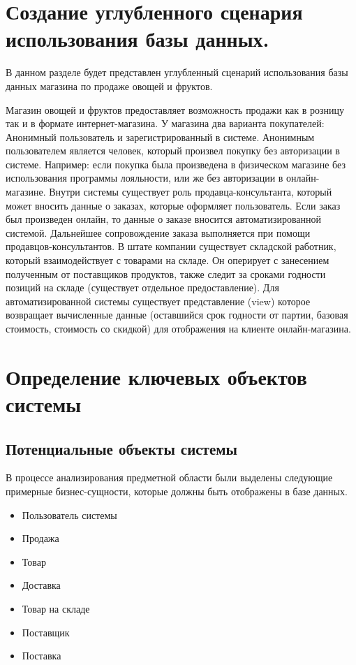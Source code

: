 \documentclass[14pt]{extreport}
\begin{document}
\pagestyle{empty} %


\pagestyle{plain} %

\chapter{Создание углубленного сценария использования базы данных.}

В данном разделе будет представлен углубленный сценарий использования базы данных магазина по продаже овощей и фруктов.


Магазин овощей и фруктов предоставляет возможность продажи как в розницу так и в формате интернет-магазина. У магазина два варианта покупателей: Анонимный пользователь и зарегистрированный в системе. Анонимным пользователем является человек, который произвел покупку без авторизации в системе. Например: если покупка была произведена в физическом магазине без использования программы лояльности, или же без авторизации в онлайн-магазине. Внутри системы существует роль продавца-консультанта, который может вносить данные о заказах, которые оформляет пользователь. Если заказ был произведен онлайн, то данные о заказе вносится автоматизированной системой. Дальнейшее сопровождение заказа выполняется при помощи продавцов-консультантов. В штате компании существует складской работник, который взаимодействует с товарами на складе. Он оперирует с занесением полученным от поставщиков продуктов, также следит за сроками годности позиций на складе (существует отдельное предоставление). Для автоматизированной системы существует представление (view) которое возвращает вычисленные данные (оставшийся срок годности от партии, базовая стоимость, стоимость со скидкой) для отображения на клиенте онлайн-магазина.

\chapter{Определение ключевых объектов системы}

    \section{Потенциальные объекты системы}
        В процессе анализирования предметной области были выделены следующие примерные бизнес-сущности, которые должны быть отображены в базе данных.

        \begin{itemize}
            \item Пользователь системы
            \item Продажа
            \item Товар
            \item Доставка
            \item Товар на складе
            \item Поставщик
            \item Поставка
        \end{itemize}
    
\end{document}
